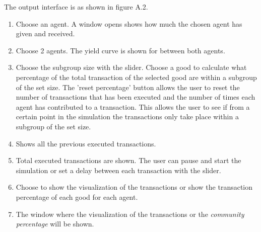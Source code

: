 \documentclass[twoside,openright]{uva-bachelor-thesis}
\begin{document}
The output interface is as shown in figure A.2.
\begin{enumerate}
\item Choose an agent. A window opens shows how much the chosen agent has given and received.
\item Choose 2 agents. The yield curve is shown for between both agents.
\item Choose the subgroup size with the slider. Choose a good to calculate what percentage of the total transaction of the selected good are within a subgroup of the set size. The 'reset percentage' button allows the user to reset the number of transactions that has been executed and the number of times each agent has contributed to a transaction. This allows the user to see if from a certain point in the simulation the transactions only take place within a subgroup of the set size.
\item Shows all the previous executed transactions.
\item Total executed transactions are shown. The user can pause and start the simulation or set a delay between each transaction with the slider.
\item Choose to show the visualization of the transactions or show the transaction percentage of each good for each agent.
\item The window where the visualization of the transactions or the \textit{community percentage} will be shown.
\end{enumerate}
\end{document}
